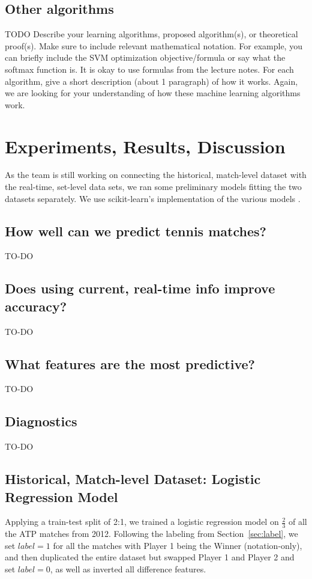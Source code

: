 \documentclass[paper=a4, fontsize=11pt]{scrartcl} %
\numberwithin{equation}{section} %
\numberwithin{figure}{section} %
\numberwithin{table}{section} %
\begin{document}
\subsection{Other algorithms}
TODO
Describe your learning algorithms, proposed algorithm(s), or theoretical proof(s). Make sure to include relevant mathematical notation. For example, you can briefly include the SVM optimization objective/formula or say what the softmax function is. It is okay to use formulas from the lecture notes. For each algorithm, give a short description (about 1 paragraph) of how it works. Again, we are looking for your understanding of how these machine learning algorithms work. 



\section{Experiments, Results, Discussion}
As the team is still working on connecting the historical, match-level dataset with the real-time, set-level data sets, we ran some preliminary models fitting the two datasets separately. We use scikit-learn's implementation of the various models \cite{scikit-learn}.
\subsection{How well can we predict tennis matches?}
TO-DO
\subsection{Does using current, real-time info improve accuracy?}
TO-DO
\subsection{What features are the most predictive?}
TO-DO
\subsection{Diagnostics}
TO-DO

\subsection{Historical, Match-level Dataset: Logistic Regression Model}
Applying a train-test split of 2:1, we trained a logistic regression model on $\frac{2}{3}$ of all the ATP matches from 2012. Following the labeling from Section~\ref{sec:label}, we set $label = 1$ for all the matches with Player 1 being the Winner (notation-only), and then duplicated the entire dataset but swapped Player 1 and Player 2 and set $label = 0$, as well as inverted all difference features.
\end{document}
